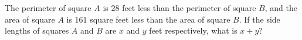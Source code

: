 The perimeter of square $A$ is $28$ feet less than the perimeter of square $B$, and the area of square $A$ is $161$ square feet less than the area of square $B$. If the side lengths of squares $A$ and $B$ are $x$ and $y$ feet respectively, what is $x+y$?
